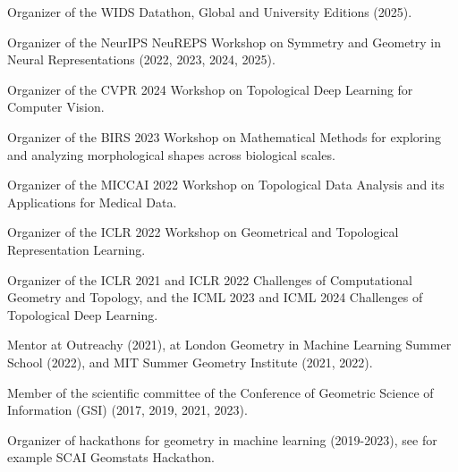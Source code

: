 Organizer of the WIDS Datathon, Global and University Editions (2025).

Organizer of the NeurIPS NeuREPS Workshop on Symmetry and Geometry in Neural Representations (2022, 2023, 2024, 2025).

Organizer of the CVPR 2024 Workshop on Topological Deep Learning for Computer Vision.

Organizer of the BIRS 2023 Workshop on Mathematical Methods for exploring and analyzing morphological shapes across biological scales.

Organizer of the MICCAI 2022 Workshop on Topological Data Analysis and its Applications for Medical Data.

Organizer of the ICLR 2022 Workshop on Geometrical and Topological Representation Learning.

Organizer of the ICLR 2021 and ICLR 2022 Challenges of Computational Geometry and Topology, and the ICML 2023 and ICML 2024 Challenges of Topological Deep Learning.

Mentor at Outreachy (2021), at London Geometry in Machine Learning Summer School (2022), and MIT Summer Geometry Institute (2021, 2022).

Member of the scientific committee of the Conference of Geometric Science of Information (GSI) (2017, 2019, 2021, 2023).

Organizer of hackathons for geometry in machine learning (2019-2023), see for example SCAI Geomstats Hackathon.
